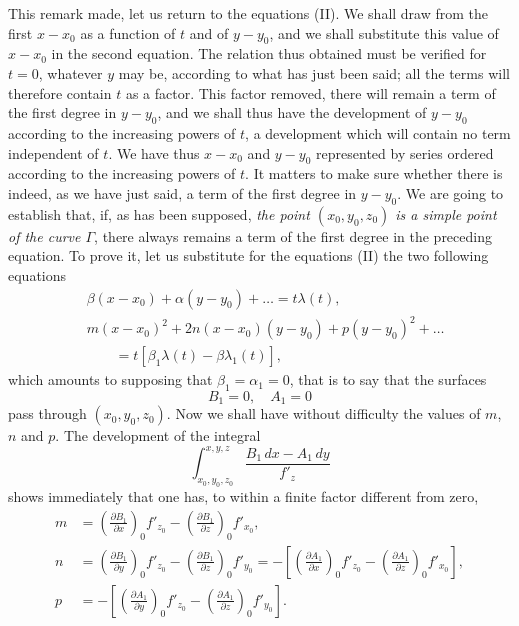 \documentclass{article}
\begin{document}
This remark made, let us return to the equations (II). We shall draw from the first $x - x_{0}$ as a function of $t$ and of $y - y_{0}$, and we shall substitute this value of $x - x_{0}$ in the second equation. The relation thus obtained must be verified for $t = 0$, whatever $y$ may be, according to what has just been said; all the terms will therefore contain $t$ as a factor. This factor removed, there will remain a term of the first degree in $y - y_{0}$, and we shall thus have the development of $y - y_{0}$ according to the increasing powers of $t$, a development which will contain no term independent of $t$. We have thus $x - x_{0}$ and $y - y_{0}$ represented by series ordered according to the increasing powers of $t$. It matters to make sure
whether there is indeed, as we have just said, a term of the first degree in $y - y_{0}$. We are going to establish that, if, as has been supposed, \emph{the point $(x_{0}, y_{0}, z_{0})$ is a simple point of the curve $\Gamma$}, there always remains a term of the first degree in the preceding equation. To prove it, let us substitute for the equations (II) the two following equations
\[
\begin{aligned}
&\beta(x - x_{0}) + \alpha(y - y_{0}) + \ldots = t\lambda(t), \\
&m(x - x_{0})^{2} + 2n(x - x_{0})(y - y_{0}) + p(y - y_{0})^{2} + \ldots \\
&\qquad = t[\beta_{1}\lambda(t) - \beta\lambda_{1}(t)],
\end{aligned}
\]
which amounts to supposing that $\beta_{1} = \alpha_{1} = 0$, that is to say that the surfaces
\[
B_{1} = 0, \quad A_{1} = 0
\]
pass through $(x_{0}, y_{0}, z_{0})$. Now we shall have without difficulty the values of $m$, $n$ and $p$. The development of the integral
\[
\int_{x_{0}, y_{0}, z_{0}}^{x, y, z} \frac{B_{1}\,dx - A_{1}\,dy}{f'_{z}}
\]
shows immediately that one has, to within a finite factor different from zero,
\[
\begin{aligned}
m &= \left( \frac{\partial B_{1}}{\partial x} \right)_{0} f'_{z_{0}} - \left( \frac{\partial B_{1}}{\partial z} \right)_{0} f'_{x_{0}}, \\
n &= \left( \frac{\partial B_{1}}{\partial y} \right)_{0} f'_{z_{0}} - \left( \frac{\partial B_{1}}{\partial z} \right)_{0} f'_{y_{0}} = - \left[ \left( \frac{\partial A_{1}}{\partial x} \right)_{0} f'_{z_{0}} - \left( \frac{\partial A_{1}}{\partial z} \right)_{0} f'_{x_{0}} \right], \\
p &= - \left[ \left( \frac{\partial A_{1}}{\partial y} \right)_{0} f'_{z_{0}} - \left( \frac{\partial A_{1}}{\partial z} \right)_{0} f'_{y_{0}} \right].
\end{aligned}
\]
\end{document}
